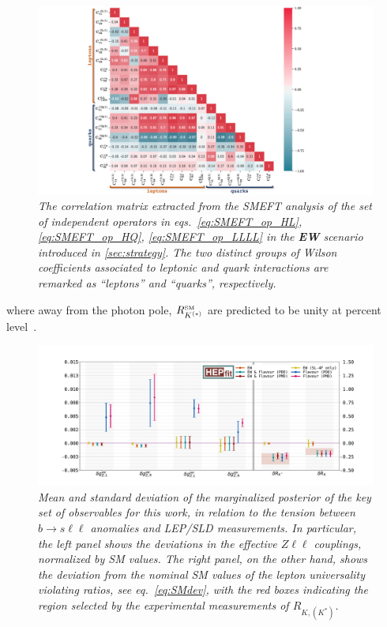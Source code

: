 \begin{figure}[ht!]
	\centering
	\includegraphics[width=\textwidth]{figures/heatmap_EW_loop.pdf}
	\caption{\it The correlation matrix extracted from the SMEFT analysis of the set of independent operators in eqs.~\eqref{eq:SMEFT_op_HL}, \eqref{eq:SMEFT_op_HQ}, \eqref{eq:SMEFT_op_LLLL} in the \textbf{EW} scenario introduced in \autoref{sec:strategy}. The two distinct groups of Wilson coefficients associated to leptonic and quark interactions are remarked as ``leptons'' and ``quarks'', respectively.}
	\label{fig:ew_corr}
\end{figure}
\noindent where away from the photon pole, $R_{K^{(*)}}^{\textrm{\tiny SM}}$ are predicted to be unity at percent level~\cite{Bordone:2016gaq}.

\begin{figure}[htp!]
	\centering
	\includegraphics[width=\textwidth]{figures/errorbar_dg.pdf}
	\caption{\it Mean and standard deviation of the marginalized posterior of the key set of observables for this work, in relation to the tension between $b \to s \ell \ell$ anomalies and LEP/SLD measurements. In particular, the left panel shows the deviations in the effective $Z\ell\ell$ couplings, normalized by SM values. The right panel, on the other hand, shows the deviation from the nominal SM values of the lepton universality violating ratios, see eq.~\eqref{eq:SMdev}, with the red boxes indicating the region selected by the experimental measurements of $R_{K,(K^*)}$.
	}
	\label{fig:ew_flav_dg}
\end{figure}

